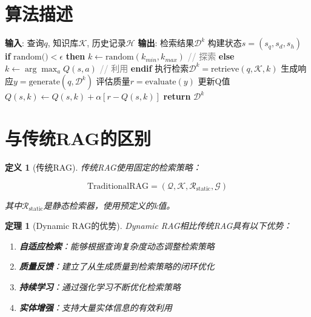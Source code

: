 \documentclass{ctexart}
\newtheorem{definition}{定义}
\newtheorem{theorem}{定理}
\begin{document}
\section{算法描述}

\begin{algorithm}
\caption{Dynamic RAG检索算法}
\begin{algorithmic}[1]
\STATE \textbf{输入}: 查询$q$, 知识库$\mathcal{K}$, 历史记录$\mathcal{H}$
\STATE \textbf{输出}: 检索结果$\mathcal{D}^k$
\STATE 构建状态$s = (s_q, s_d, s_h)$
\STATE \textbf{if} $\text{random()} < \epsilon$ \textbf{then}
\STATE \quad $k \leftarrow \text{random}(k_{min}, k_{max})$ \quad \textcolor{gray}{// 探索}
\STATE \textbf{else}
\STATE \quad $k \leftarrow \arg\max_{a} Q(s, a)$ \quad \textcolor{gray}{// 利用}
\STATE \textbf{endif}
\STATE 执行检索$\mathcal{D}^k = \text{retrieve}(q, \mathcal{K}, k)$
\STATE 生成响应$y = \text{generate}(q, \mathcal{D}^k)$
\STATE 评估质量$r = \text{evaluate}(y)$
\STATE 更新Q值$Q(s, k) \leftarrow Q(s, k) + \alpha[r - Q(s, k)]$
\STATE \textbf{return} $\mathcal{D}^k$
\end{algorithmic}
\end{algorithm}

\section{与传统RAG的区别}

\begin{definition}[传统RAG]
传统RAG使用固定的检索策略：

$$\text{TraditionalRAG} = (\mathcal{Q}, \mathcal{K}, \mathcal{R}_{\text{static}}, \mathcal{G})$$

其中$\mathcal{R}_{\text{static}}$是静态检索器，使用预定义的k值。
\end{definition}

\begin{theorem}[Dynamic RAG的优势]
Dynamic RAG相比传统RAG具有以下优势：
\begin{enumerate}
    \item \textbf{自适应检索}：能够根据查询复杂度动态调整检索策略
    \item \textbf{质量反馈}：建立了从生成质量到检索策略的闭环优化
    \item \textbf{持续学习}：通过强化学习不断优化检索策略
    \item \textbf{实体增强}：支持大量实体信息的有效利用
\end{enumerate}
\end{theorem}
\end{document}
